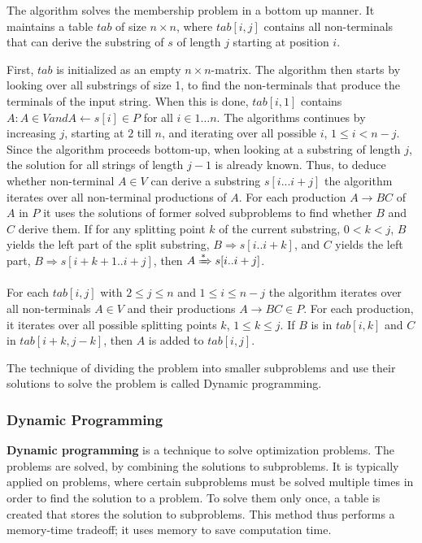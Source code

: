 The algorithm solves the membership problem in a bottom up manner.
It maintains a table $tab$ of size $n\times n$, where $tab[i,j]$ contains all non-terminals that can derive the substring of $s$ of length $j$ starting at position $i$.

First, $tab$ is initialized as an empty $n\times n$-matrix.
The algorithm then starts by looking over all substrings of size 1, to find the non-terminals that produce the terminals of the input string.
When this is done, $tab[i,1]$ contains ${A: A\in V and A\leftarrow s[i] \in P}$ for all $i\in {1\dots n}$.
The algorithms continues by increasing $j$, starting at $2$ till $n$, and iterating over all possible $i$, $1\leq i < n-j$.
Since the algorithm proceeds bottom-up, when looking at a substring of length $j$, the solution for all strings of length $j-1$ is already known.
Thus, to deduce whether non-terminal $A\in V$ can derive a substring $s[i...i+j]$ the algorithm iterates over all non-terminal productions of $A$.
For each production $A\rightarrow BC$ of $A$ in $P$ it uses the solutions of former solved subproblems to find whether $B$ and $C$ derive them.
If for any splitting point $k$ of the current substring, $0 < k < j$, $B$ yields the left part of the split substring, $B\Rightarrow s[i..i+k]$, and $C$ yields the left part, $B\Rightarrow s[i+k+1..i+j]$, then $A\xRightarrow{*} s[i..i+j]$.

For each $tab[i,j]$ with $2\leq j \leq n$ and $1\leq i \le n-j$ the algorithm iterates over all non-terminals $A\in V$ and their productions $A\rightarrow BC \in P$.
For each production, it iterates over all possible splitting points $k$, $1\leq k\le j$.
If $B$ is in $tab[i, k]$ and $C$ in $tab[i+k,j-k]$, then $A$ is added to $tab[i,j]$.

The technique of dividing the problem into smaller subproblems and use their solutions to solve the problem is called Dynamic programming.

\subsubsection{Dynamic Programming}
\label{sec:dynamic_programming}
\textbf{Dynamic programming} is a technique to solve optimization problems.
The problems are solved, by combining the solutions to subproblems.
It is typically applied on problems, where certain subproblems must be solved multiple times in order to find the solution to a problem.
To solve them only once, a table is created that stores the solution to subproblems.
This method thus performs a memory-time tradeoff; it uses memory to save computation time.

